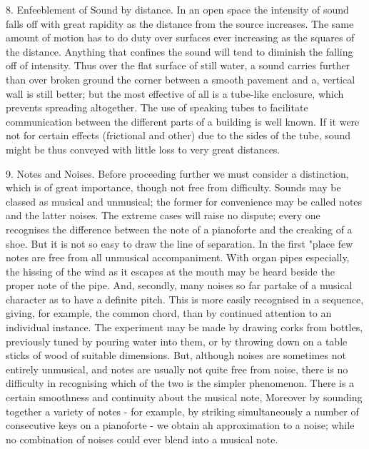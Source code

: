 8.  Enfeeblement of Sound by distance.  In an open space the intensity of sound
falls off with great rapidity as the distance from the source increases. The
same amount of motion has to do duty over surfaces ever increasing as the
squares of the distance.  Anything that confines the sound will tend to
diminish the falling off of intensity. Thus over the flat surface of still
water, a sound carries further than over broken ground the corner between a
smooth pavement and a, vertical wall is still better; but the most effective of
all is a tube-like enclosure, which prevents spreading altogether. The use of
speaking tubes to facilitate communication between the different parts of a
building is well known. If it were not for certain effects (frictional and
other) due to the sides of the tube, sound might be thus conveyed with little
loss to very great distances.

9.  Notes and Noises.  Before proceeding further we must consider a
distinction, which is of great importance, though not free from difficulty.
Sounds may be classed as musical and unmusical; the former for convenience may
be called notes and the latter noises. The extreme cases will raise no dispute;
every one recognises the difference between the note of a pianoforte and the
creaking of a shoe. But it is not so easy to draw the line of separation. In
the first "place few notes are free from all unmusical accompaniment. With
organ pipes especially, the hissing of the wind as it escapes at the mouth may
be heard beside the proper note of the pipe. And, secondly, many noises so far
partake of a musical character as to have a definite pitch. This is more easily
recognised in a sequence, giving, for example, the common chord, than by
continued attention to an individual instance. The experiment may be made by
drawing corks from bottles, previously tuned by pouring water into them, or by
throwing down on a table sticks of wood of suitable dimensions. But, although
noises are sometimes not entirely unmusical, and notes are usually not quite
free from noise, there is no difficulty in recognising which of the two is the
simpler phenomenon. There is a certain smoothness and continuity about the
musical note, Moreover by sounding together a variety of notes - for example,
by striking simultaneously a number of consecutive keys on a pianoforte - we
obtain ah approximation to a noise; while no combination of noises could ever
blend into a musical note.

